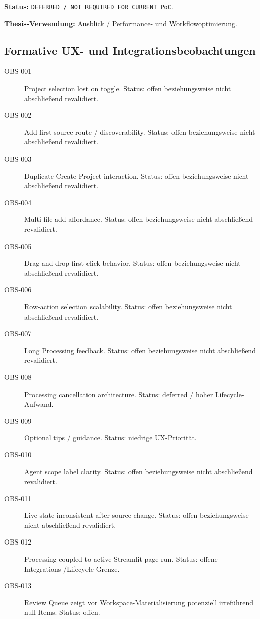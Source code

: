 \textbf{Status:}
\texttt{DEFERRED / NOT REQUIRED FOR CURRENT PoC}.

\textbf{Thesis-Verwendung:}
Ausblick / Performance- und Workflowoptimierung.


\subsection{Formative UX- und Integrationsbeobachtungen}


\begin{description}
    \item[OBS-001] Project selection lost on toggle. Status: offen beziehungsweise nicht abschließend revalidiert.
    \item[OBS-002] Add-first-source route / discoverability. Status: offen beziehungsweise nicht abschließend revalidiert.
    \item[OBS-003] Duplicate Create Project interaction. Status: offen beziehungsweise nicht abschließend revalidiert.
    \item[OBS-004] Multi-file add affordance. Status: offen beziehungsweise nicht abschließend revalidiert.
    \item[OBS-005] Drag-and-drop first-click behavior. Status: offen beziehungsweise nicht abschließend revalidiert.
    \item[OBS-006] Row-action selection scalability. Status: offen beziehungsweise nicht abschließend revalidiert.
    \item[OBS-007] Long Processing feedback. Status: offen beziehungsweise nicht abschließend revalidiert.
    \item[OBS-008] Processing cancellation architecture. Status: deferred / hoher Lifecycle-Aufwand.
    \item[OBS-009] Optional tips / guidance. Status: niedrige UX-Priorität.
    \item[OBS-010] Agent scope label clarity. Status: offen beziehungsweise nicht abschließend revalidiert.
    \item[OBS-011] Live state inconsistent after source change. Status: offen beziehungsweise nicht abschließend revalidiert.
    \item[OBS-012] Processing coupled to active Streamlit page run. Status: offene Integrations-/Lifecycle-Grenze.
    \item[OBS-013] Review Queue zeigt vor Workspace-Materialisierung potenziell irreführend null Items. Status: offen.

\end{description}

